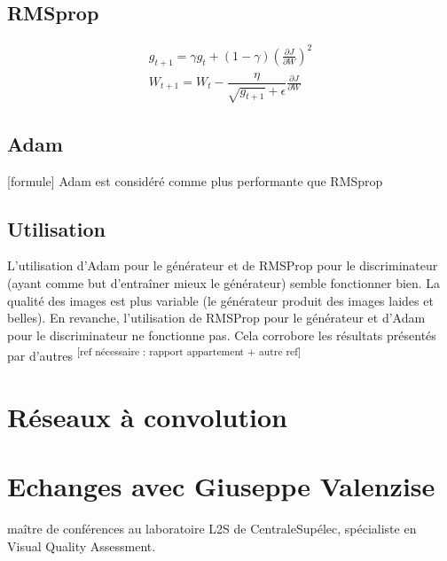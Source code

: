 \subsection{RMSprop}

\begin{equation} 
\begin{aligned}
g_{t+1} = \gamma g_t + (1-\gamma)(\frac{\partial J}{\partial W})^2 \\
W_{t+1} = W_t - \dfrac{\eta}{\sqrt{g_{t+1}} + \epsilon}\frac{\partial J}{\partial W}
\end{aligned}
\end{equation} 

\subsection{Adam}
[formule]
Adam est considéré comme plus performante que RMSprop
\subsection{Utilisation}

L’utilisation d’Adam pour le générateur et de RMSProp pour le discriminateur (ayant
comme but d'entraîner mieux le générateur) semble fonctionner bien. La qualité des images
est plus variable (le générateur produit des images laides et belles).
En revanche, l'utilisation de RMSProp pour le générateur et d'Adam pour le discriminateur ne fonctionne pas. Cela corrobore les résultats présentés par d'autres \textsuperscript{[ref nécessaire : rapport appartement + autre ref]}



\section{Réseaux à convolution}

\section{Echanges avec Giuseppe Valenzise}
maître de conférences au laboratoire L2S de CentraleSupélec, spécialiste en Visual Quality Assessment.

